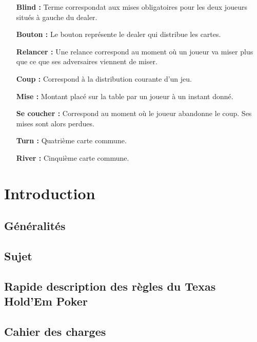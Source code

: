 \documentclass{report}
\begin{document}
\begin{itemize}
		\item[\textbf{Blind : }]Terme correspondat aux mises obligatoires pour les deux joueurs situés à gauche du dealer.\medskip
		
		\item[\textbf{Bouton : }]Le bouton représente le dealer qui distribue les cartes.\medskip
		
		\item[\textbf{Relancer : }]Une relance correspond au moment où un joueur va miser plus que ce que ses adversaires viennent de miser.\medskip
		
		\item[\textbf{Coup : }]Correspond à la distribution courante d'un jeu.\medskip
		
		\item[\textbf{Mise : }]Montant placé sur la table par un joueur à un instant donné.\medskip
		
		\item[\textbf{Se coucher : }]Correspond au moment où le joueur abandonne le coup. Ses mises sont alors perdues.\medskip
		
		\item[\textbf{Turn : }]Quatrième carte commune.\medskip
		
		\item[\textbf{River : }]Cinquième carte commune.\medskip
		
		
\end{itemize}



\chapter{Introduction}

\section{Généralités}

\section{Sujet}

\section{Rapide description des règles du Texas Hold'Em Poker}

\section{Cahier des charges}
\end{document}

